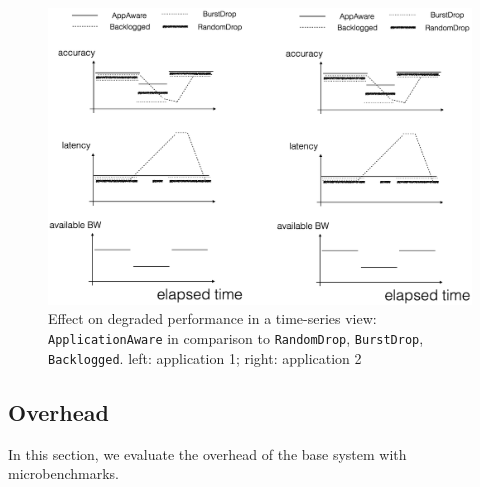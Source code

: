 \begin{figure}
  \centering
  \includegraphics[width=.95\linewidth]{figures/degrade-placeholder-2.png}
  \caption{Effect on degraded performance in a time-series view:
    \texttt{ApplicationAware} in comparison to \texttt{RandomDrop},
    \texttt{BurstDrop}, \texttt{Backlogged}. left: application 1; right:
    application 2}
  \label{fig:degrade}
\end{figure}

\subsection{Overhead}
\label{sec:overhead}

In this section, we evaluate the overhead of the base system with
microbenchmarks.

